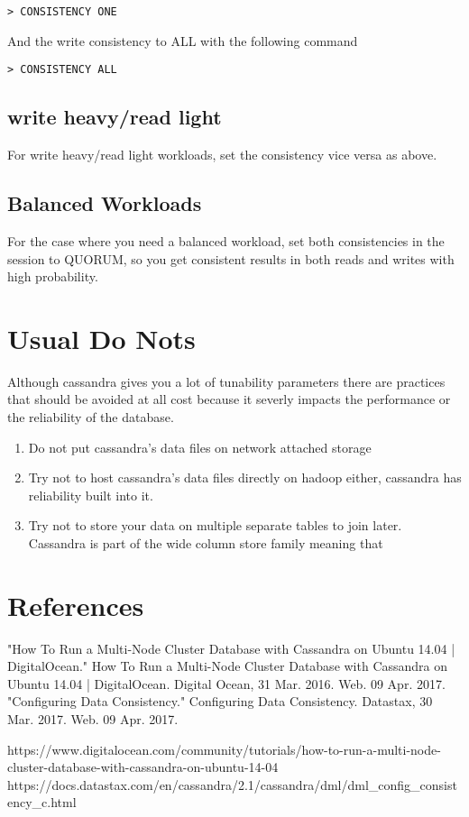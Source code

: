 \documentclass[9pt,twocolumn,twoside]{idsi}
\begin{document}
\begin{lstlisting}[breaklines]
> CONSISTENCY ONE
\end{lstlisting}

And the write consistency to ALL with the following command

\begin{lstlisting}[breaklines]
> CONSISTENCY ALL
\end{lstlisting}

\subsection{write heavy/read light}

For write heavy/read light workloads, set the consistency vice versa as above. 

\subsection{Balanced Workloads}
For the case where you need a balanced workload, set both consistencies in the session to QUORUM, so you get consistent results in both reads and writes with high probability.

\section{Usual Do Nots}

Although cassandra gives you a lot of tunability parameters there are practices that should be avoided at all cost because it severly impacts the performance or the reliability of the database.

\begin{enumerate}
\item Do not put cassandra's data files on network attached storage
\item Try not to host cassandra's data files directly on hadoop either, cassandra has reliability built into it.
\item Try not to store your data on multiple separate tables to join later. Cassandra is part of the wide column store family meaning that
\end{enumerate}

\section*{References}
"How To Run a Multi-Node Cluster Database with Cassandra on Ubuntu 14.04 | DigitalOcean." How To Run a Multi-Node Cluster Database with Cassandra on Ubuntu 14.04 | DigitalOcean. Digital Ocean, 31 Mar. 2016. Web. 09 Apr. 2017.
"Configuring Data Consistency." Configuring Data Consistency. Datastax, 30 Mar. 2017. Web. 09 Apr. 2017.

https://www.digitalocean.com/community/tutorials/how-to-run-a-multi-node-cluster-database-with-cassandra-on-ubuntu-14-04
https://docs.datastax.com/en/cassandra/2.1/cassandra/dml/dml_config_consistency_c.html
\end{document}
